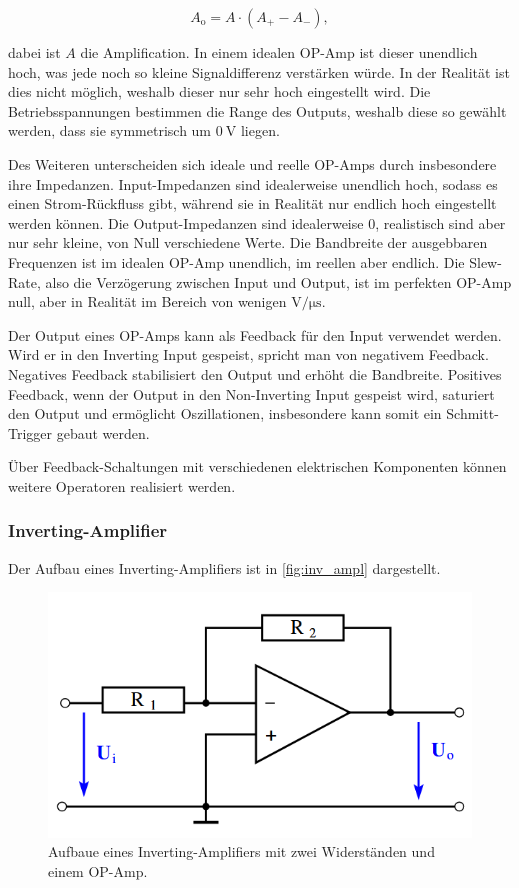 \begin{equation*}
    A_\text{o} = A \cdot (A_+ - A_-),
\end{equation*}

dabei ist $A$ die Amplification. In einem idealen OP-Amp ist dieser unendlich hoch, was jede noch so kleine Signaldifferenz verstärken würde. In der Realität ist dies nicht möglich, 
weshalb dieser nur sehr hoch eingestellt wird. Die Betriebsspannungen bestimmen die Range des Outputs, weshalb diese so gewählt werden, dass sie symmetrisch um $\SI{0}{\volt}$ liegen.

Des Weiteren unterscheiden sich ideale und reelle OP-Amps durch insbesondere ihre Impedanzen. Input-Impedanzen sind idealerweise unendlich hoch, sodass es einen Strom-Rückfluss gibt,
während sie in Realität nur endlich hoch eingestellt werden können. Die Output-Impedanzen sind idealerweise 0, realistisch sind aber nur sehr kleine, von Null verschiedene Werte.
Die Bandbreite der ausgebbaren Frequenzen ist im idealen OP-Amp unendlich, im reellen aber endlich. Die Slew-Rate, also die Verzögerung zwischen Input und Output, ist im perfekten OP-Amp null, aber in Realität im Bereich von wenigen $\si{\volt\per\micro\second}$.

Der Output eines OP-Amps kann als Feedback für den Input verwendet werden. Wird er in den Inverting Input gespeist,
spricht man von negativem Feedback. Negatives Feedback stabilisiert den Output und erhöht die Bandbreite. Positives Feedback, wenn der Output in den Non-Inverting Input gespeist wird,
saturiert den Output und ermöglicht Oszillationen, insbesondere kann somit ein Schmitt-Trigger gebaut werden.

Über Feedback-Schaltungen mit verschiedenen elektrischen Komponenten können weitere Operatoren realisiert werden.

\subsubsection{Inverting-Amplifier}

Der Aufbau eines Inverting-Amplifiers ist in \autoref{fig:inv_ampl} dargestellt.

\begin{figure}[H]
    \centering
    \includegraphics[width=\textwidth]{../theorie_bilder/inv_ampl.png}
    \caption{Aufbaue eines Inverting-Amplifiers mit zwei Widerständen und einem OP-Amp.}
    \label{fig:inv_ampl}
\end{figure}


